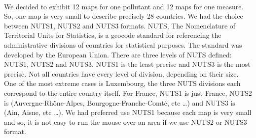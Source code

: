 \documentclass[preprint,journal]{vgtc}       %
\begin{document}
	\paragraph{}
	We decided to exhibit 12 maps for one pollutant and 12 maps for one measure. So, one map is very small to describe precisely 28 countries. We had the choice between NUTS1, NUTS2 and NUTS3 formats.
	\newline
NUTS, The Nomenclature of Territorial Units for Statistics, is a geocode standard for referencing the administrative divisions of countries for statistical purposes. The standard was developed by the European Union. There are three levels of NUTS defined: NUTS1, NUTS2 and NUTS3. NUTS1 is the least precise and NUTS3 is the most precise.
\newline
Not all countries have every level of division, depending on their size. One of the most extreme cases is Luxembourg, the three NUTS divisions each correspond to the entire country itself. For France, NUTS1 is just France, NUTS2 is (Auvergne-Rhône-Alpes, Bourgogne-Franche-Comté, etc …) and NUTS3 is (Ain, Aisne, etc …).
\newline
We had preferred use NUTS1 because each map is very small and so, it is not easy to run the mouse over an area if we use NUTS2 or NUTS3 format.
\end{document}
